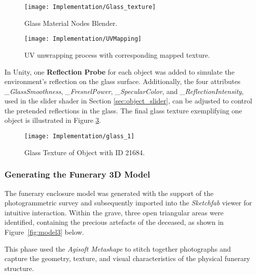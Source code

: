  \begin{figure}[h!]
    \centering
    \texttt{[image: Implementation/Glass\_texture]}
    \caption{Glass Material Nodes Blender.}
    \label{fig:glass_texture}    
\end{figure}


\begin{figure}[h!]
    \centering
    \texttt{[image: Implementation/UVMapping]}
    \caption{UV unwrapping process with corresponding mapped texture.}
    \label{fig:uv_process}
\end{figure}


In Unity, one \textbf{Reflection Probe} for each object was added to simulate the environment's reflection on the glass surface.
Additionally, the four attributes \emph{\_GlassSmoothness}, \emph{\_FresnelPower}, \emph{\_SpecularColor}, and \emph{\_ReflectionIntensity}, used in the slider shader in Section \ref{sec:object_slider}, can be adjusted to control the pretended reflections in the glass.
The final glass texture exemplifying one object is illustrated in Figure \ref{fig:glass1}.

\begin{figure}[h!]
    \centering
    \texttt{[image: Implementation/glass\_1]}
    \caption{Glass Texture of Object with ID 21684.}
    \label{fig:glass1}
\end{figure}



\subsubsection{Generating the Funerary \gls{3D} Model}
\label{sec:build_model}

The funerary enclosure model was generated with the support of the photogrammetric survey and subsequently imported into the \textit{Sketchfab} viewer for intuitive interaction.
Within the grave, three open triangular areas were identified, containing the precious artefacts of the deceased, as shown in Figure~\ref{fig:model3} below.

This phase used the \textit{Agisoft Metashape} to stitch together photographs and capture the geometry, texture, and visual characteristics of the physical funerary structure.

